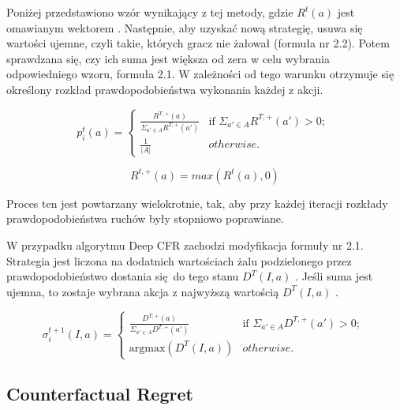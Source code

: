 \documentclass[12pt,oneside,a4paper]{report}
\begin{document}
Poniżej przedstawiono wzór wynikający z tej metody, gdzie  
$R^{t}(a)$ jest omawianym wektorem \cite{CFR}. 
Następnie, aby uzyskać nową strategię, usuwa się wartości ujemne, czyli takie, których gracz nie
żałował (formuła nr 2.2).
Potem sprawdzana się, czy ich suma jest większa od zera w celu wybrania odpowiedniego wzoru, formuła
2.1.
W zależności od tego warunku otrzymuje się określony rozkład prawdopodobieństwa wykonania każdej z
akcji.


\begin{equation}
p^{t}_{i}\left( a \right) = \left\{ \begin{array}{ll}
      \frac{R^{T, \text{+}}\left(a\right)}{ \Sigma_{a' \in A} R^{T,\text{+}}\left(a'\right)} &
      \mbox{if $\Sigma_{a' \in A} R^{T,\text{+}}\left(a'\right) >
      0$};\\
      \frac{1}{|A|} & \mbox{$otherwise$}.\end{array} \right. \ 
\end{equation}

\vspace{1cm}
\begin{equation}
   R^{t,\text{+}}(a) = max(R^t(a),0)
\end{equation}


Proces ten jest powtarzany wielokrotnie, tak, aby przy każdej iteracji rozkłady prawdopodobieństwa
ruchów były stopniowo
poprawiane.

W przypadku algorytmu Deep CFR zachodzi modyfikacja formuły nr 2.1. Strategia jest liczona na
dodatnich wartościach żalu podzielonego przez  prawdopodobieństwo dostania się do 
tego stanu $D^{T} (I, a)$ \cite{DCFR}.
Jeśli suma jest ujemna, to zostaje wybrana akcja z najwyższą wartością $D^{T}(I, a)$ \cite{DCFR}.



\begin{equation}
\sigma^{t+1}_{i}\left(I, a \right) = \left\{ \begin{array}{ll}
      \frac{D^{T, \text{+}}\left(a\right)}{ \Sigma_{a' \in A} D^{T,\text{+}}\left(a'\right)} &
      \mbox{if $\Sigma_{a' \in A} D^{T,\text{+}}\left(a'\right) >
      0$};\\
      \text{argmax}(D^{T} (I, a)) & \mbox{$otherwise$}.\end{array} \right. \ 
\end{equation}



\subsection{Counterfactual Regret}
\end{document}
